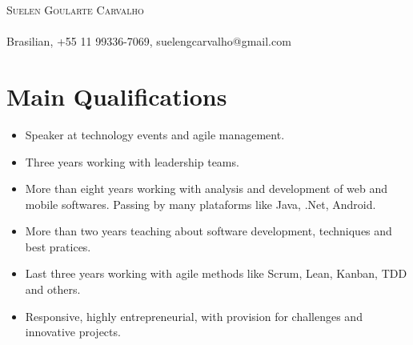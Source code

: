 \documentclass[a4paper, oneside, final]{article}
\begin{document}
\begin{center}
\textsc{\Huge{Suelen Goularte Carvalho}}\\
\ \\
Brasilian, +55 11 99336-7069, suelengcarvalho@gmail.com





\section{Main Qualifications}

\begin{itemize}
	\item Speaker at technology events and agile management.
	\item Three years working with leadership teams.
	\item More than eight years working with analysis and development of web and mobile softwares. Passing by many plataforms like Java, .Net, Android.
	\item More than two years teaching about software development, techniques and best pratices. 
	\item Last three years working with agile methods like Scrum, Lean, Kanban, TDD and others. 
	\item Responsive, highly entrepreneurial, with provision for challenges and innovative projects.\\
\end{itemize}


\end{center}
\end{document}
